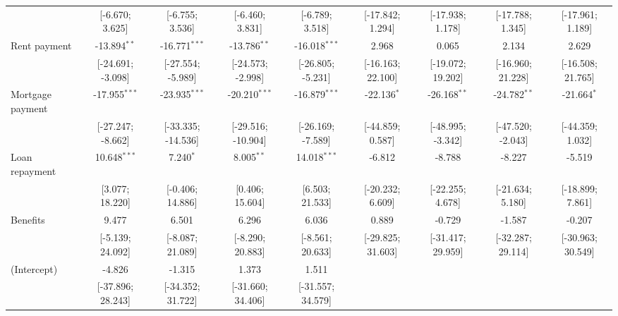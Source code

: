 \begin{table}[htbp]
\begin{threeparttable}[b]
\begin{tabular}{lcccccccc}
                                & [-6.670; 3.625]    & [-6.755; 3.536]    & [-6.460; 3.831]    & [-6.789; 3.518]    & [-17.842; 1.294]   & [-17.938; 1.178]   & [-17.788; 1.345]   & [-17.961; 1.189]\\   
         Rent payment           & -13.894$^{**}$     & -16.771$^{***}$    & -13.786$^{**}$     & -16.018$^{***}$    & 2.968              & 0.065              & 2.134              & 2.629\\   
                                & [-24.691; -3.098]  & [-27.554; -5.989]  & [-24.573; -2.998]  & [-26.805; -5.231]  & [-16.163; 22.100]  & [-19.072; 19.202]  & [-16.960; 21.228]  & [-16.508; 21.765]\\   
         Mortgage payment       & -17.955$^{***}$    & -23.935$^{***}$    & -20.210$^{***}$    & -16.879$^{***}$    & -22.136$^{*}$      & -26.168$^{**}$     & -24.782$^{**}$     & -21.664$^{*}$\\   
                                & [-27.247; -8.662]  & [-33.335; -14.536] & [-29.516; -10.904] & [-26.169; -7.589]  & [-44.859; 0.587]   & [-48.995; -3.342]  & [-47.520; -2.043]  & [-44.359; 1.032]\\   
         Loan repayment         & 10.648$^{***}$     & 7.240$^{*}$        & 8.005$^{**}$       & 14.018$^{***}$     & -6.812             & -8.788             & -8.227             & -5.519\\   
                                & [3.077; 18.220]    & [-0.406; 14.886]   & [0.406; 15.604]    & [6.503; 21.533]    & [-20.232; 6.609]   & [-22.255; 4.678]   & [-21.634; 5.180]   & [-18.899; 7.861]\\   
         Benefits               & 9.477              & 6.501              & 6.296              & 6.036              & 0.889              & -0.729             & -1.587             & -0.207\\   
                                & [-5.139; 24.092]   & [-8.087; 21.089]   & [-8.290; 20.883]   & [-8.561; 20.633]   & [-29.825; 31.603]  & [-31.417; 29.959]  & [-32.287; 29.114]  & [-30.963; 30.549]\\   
         (Intercept)            & -4.826             & -1.315             & 1.373              & 1.511              &                    &                    &                    &   \\   
                                & [-37.896; 28.243]  & [-34.352; 31.722]  & [-31.660; 34.406]  & [-31.557; 34.579]  &                    &                    &                    &   \\   

\end{tabular}
\end{threeparttable}
\end{table}
